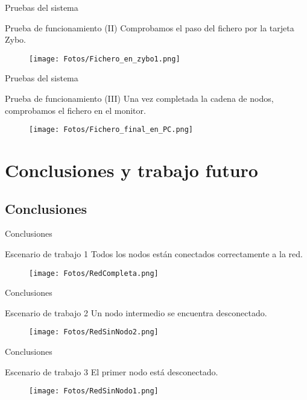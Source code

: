 \documentclass[aspectratio=169]{beamer}
\begin{document}
\begin{frame}{Pruebas del sistema}
\begin{block}{Prueba de funcionamiento (II)}
	Comprobamos el paso del fichero por la tarjeta Zybo.
	\begin{figure}[h]
		\centering
		\texttt{[image: Fotos/Fichero\_en\_zybo1.png]}
	\end{figure}
\end{block}
\end{frame}

\begin{frame}{Pruebas del sistema}
\begin{block}{Prueba de funcionamiento (III)}
	Una vez completada la cadena de nodos, comprobamos el fichero en el monitor.
	\begin{figure}[h]
		\centering
		\texttt{[image: Fotos/Fichero\_final\_en\_PC.png]}
	\end{figure}
\end{block}
\end{frame}

\section{Conclusiones y trabajo futuro}
\subsection{Conclusiones}
\begin{frame}{Conclusiones}
\begin{block}{Escenario de trabajo 1}
	Todos los nodos están conectados correctamente a la red.
	\begin{figure}[h]
		\centering
		\texttt{[image: Fotos/RedCompleta.png]}
	\end{figure}
\end{block}
\end{frame}

\begin{frame}{Conclusiones}
\begin{block}{Escenario de trabajo 2}
	Un nodo intermedio se encuentra desconectado.
	\begin{figure}[h]
		\centering
		\texttt{[image: Fotos/RedSinNodo2.png]}
	\end{figure}
\end{block}
\end{frame}

\begin{frame}{Conclusiones}
\begin{block}{Escenario de trabajo 3}
	El primer nodo está desconectado.
	\begin{figure}[h]
		\centering
		\texttt{[image: Fotos/RedSinNodo1.png]}
	\end{figure}
\end{block}
\end{frame}
\end{document}
